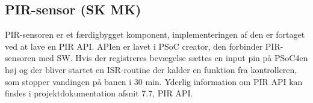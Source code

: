 \subsection{PIR-sensor (SK MK)}

PIR-sensoren er et færdigbygget komponent, implementeringen af den er fortaget ved at lave en PIR API. APIen er lavet i PSoC creator, den forbinder PIR-sensoren med SW. Hvis der registreres bevægelse sættes en input pin på PSoC4en høj og der bliver startet en ISR-routine der kalder en funktion fra kontrolleren, som stopper vandingen på banen i 30 min. Yderlig information om PIR API kan findes i projektdokumentation afsnit 7.7, PIR API. 